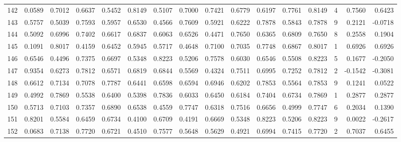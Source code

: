\begin{tabular}{lrrrrrrrrrrrrrrr}
142 &      0.0589 &  0.7012 &  0.6637 &  0.5452 &  0.8149 &  0.5107 &  0.7000 &  0.7421 &  0.6779 &  0.6197 &   0.7761 &     0.8149 &      4 &                    0.7560 &                     0.6423 \\
143 &      0.5757 &  0.5039 &  0.7593 &  0.5957 &  0.6530 &  0.4566 &  0.7609 &  0.5921 &  0.6222 &  0.7878 &   0.5843 &     0.7878 &      9 &                    0.2121 &                    -0.0718 \\
144 &      0.5092 &  0.6996 &  0.7402 &  0.6617 &  0.6837 &  0.6063 &  0.6526 &  0.4471 &  0.7650 &  0.6365 &   0.6809 &     0.7650 &      8 &                    0.2558 &                     0.1904 \\
145 &      0.1091 &  0.8017 &  0.4159 &  0.6452 &  0.5945 &  0.5717 &  0.4648 &  0.7100 &  0.7035 &  0.7748 &   0.6867 &     0.8017 &      1 &                    0.6926 &                     0.6926 \\
146 &      0.6546 &  0.4496 &  0.7375 &  0.6697 &  0.5348 &  0.8223 &  0.5206 &  0.7578 &  0.6030 &  0.6546 &   0.5508 &     0.8223 &      5 &                    0.1677 &                    -0.2050 \\
147 &      0.9354 &  0.6273 &  0.7812 &  0.6571 &  0.6819 &  0.6844 &  0.5569 &  0.4324 &  0.7511 &  0.6995 &   0.7252 &     0.7812 &      2 &                   -0.1542 &                    -0.3081 \\
148 &      0.6612 &  0.7134 &  0.7078 &  0.7787 &  0.6441 &  0.6598 &  0.6594 &  0.6946 &  0.6202 &  0.7853 &   0.5564 &     0.7853 &      9 &                    0.1241 &                     0.0522 \\
149 &      0.4992 &  0.7869 &  0.5538 &  0.6400 &  0.5398 &  0.7836 &  0.6033 &  0.6450 &  0.6184 &  0.7404 &   0.6734 &     0.7869 &      1 &                    0.2877 &                     0.2877 \\
150 &      0.5713 &  0.7103 &  0.7357 &  0.6890 &  0.6538 &  0.4559 &  0.7747 &  0.6318 &  0.7516 &  0.6656 &   0.4999 &     0.7747 &      6 &                    0.2034 &                     0.1390 \\
151 &      0.8201 &  0.5584 &  0.6459 &  0.6734 &  0.4100 &  0.6709 &  0.4191 &  0.6669 &  0.5348 &  0.8223 &   0.5206 &     0.8223 &      9 &                    0.0022 &                    -0.2617 \\
152 &      0.0683 &  0.7138 &  0.7720 &  0.6721 &  0.4510 &  0.7577 &  0.5648 &  0.5629 &  0.4921 &  0.6994 &   0.7415 &     0.7720 &      2 &                    0.7037 &                     0.6455 \\

\end{tabular}
